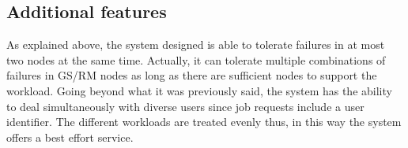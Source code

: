 \subsection{Additional features}

As explained above, the system designed is able to tolerate failures in at most two nodes at the same time. Actually, it can tolerate multiple combinations of failures in GS/RM nodes as long as there are sufficient nodes to support the workload. Going beyond what it was previously said, the system has the ability to deal simultaneously with diverse users since job requests include a user identifier. The different workloads are treated evenly thus, in this way the system offers a best effort service.